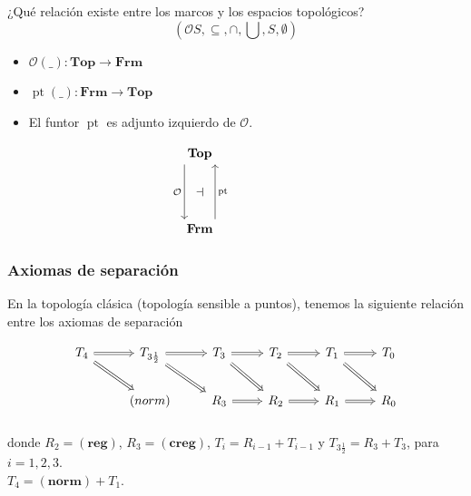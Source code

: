 \documentclass[compress,12pt]{beamer}
\DeclareMathOperator{\pt}{pt}
\begin{document}
\begin{frame}[fragile]{¿Qué relación existe entre los marcos y los espacios topológicos?}
\[
\left(\mathcal{O}S, \subseteq, \cap, \bigcup, S, \emptyset\right)
\]

\begin{itemize}
    \item $\mathcal{O}(\_)\colon \mathbf{Top}\to \mathbf{Frm}$ 
    \item $\pt(\_)\colon \mathbf{Frm}\to \mathbf{Top}$
    \item El funtor $\pt$ es adjunto izquierdo de $\mathcal{O}$.
\end{itemize}
\[\begin{tikzcd}
	{\mathbf{Top}} \\
	{} & {} & {} \\
	{\mathbf{Frm}}
	\arrow["{\pt}"{name=0, swap}, from=3-1, to=1-1, shift right=5]
	\arrow["{\mathcal{O}}"{name=1, swap}, from=1-1, to=3-1, shift right=5]
	\arrow["\dashv"{rotate=0}, from=1, to=0, phantom]
\end{tikzcd}\]
    
\end{frame}

\begin{frame}[fragile]
\frametitle{Axiomas de separación}
    En la topología clásica (topología sensible a puntos), tenemos la siguiente relación entre los axiomas de separación 

    \[\begin{tikzcd}
	{T_4} & {T_{3\frac{1}{2}}} & {T_3} & {T_2} & {T_1} & {T_0} \\
	& {(norm)} & {R_3} & {R_2} & {R_1} & {R_0}
	\arrow[Rightarrow, from=1-2, to=1-3]
	\arrow[Rightarrow, from=1-3, to=1-4]
	\arrow[Rightarrow, from=1-4, to=1-5]
	\arrow[Rightarrow, from=1-5, to=1-6]
	\arrow[Rightarrow, from=1-1, to=1-2]
	\arrow[Rightarrow, from=1-1, to=2-2]
	\arrow[Rightarrow, from=1-2, to=2-3]
	\arrow[Rightarrow, from=1-3, to=2-4]
	\arrow[Rightarrow, from=1-4, to=2-5]
	\arrow[Rightarrow, from=1-5, to=2-6]
	\arrow[Rightarrow, from=2-3, to=2-4]
	\arrow[Rightarrow, from=2-4, to=2-5]
	\arrow[Rightarrow, from=2-5, to=2-6]
\end{tikzcd}\]
\[
    \mbox{ }
\]
    
donde $R_2=\mathbf{(reg)}$, $R_3=\mathbf{(creg)}$, $T_i=R_{i-1}+T_{i-1}$ y $T_{3\frac{1}{2}}=R_3+T_3$, para $i=1, 2, 3$.\\

$T_4=\mathbf{(norm)}+T_1$.
    
\end{frame}
\end{document}
